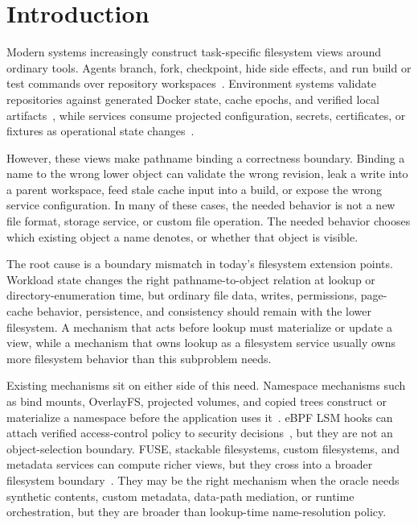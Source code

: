 \section{Introduction}

Modern systems increasingly construct task-specific filesystem views around
ordinary tools. Agents branch, fork, checkpoint, hide side effects, and run
build or test commands over repository
workspaces~\cite{agentfs_repo,branchfs_repo,yolofs_repo}. Environment systems
validate repositories against generated Docker state, cache epochs, and verified
local artifacts~\cite{docker_overview,swe_factory_repo,menvagent_repo,swe_rebench_v2_repo},
while services consume projected configuration, secrets, certificates, or
fixtures as operational state changes~\cite{kubernetes_projected_volumes}.

However, these views make pathname binding a correctness boundary. Binding a
name to the wrong lower object can validate the wrong revision, leak a write
into a parent workspace, feed stale cache input into a build, or expose the
wrong service configuration. In many of these cases, the needed behavior is not
a new file format, storage service, or custom file operation. The needed
behavior chooses which existing object a name denotes, or whether that object is
visible.

The root cause is a boundary mismatch in today's filesystem extension points.
Workload state changes the right pathname-to-object relation at lookup or
directory-enumeration time, but ordinary file data, writes, permissions,
page-cache behavior, persistence, and consistency should remain with the lower
filesystem. A mechanism that acts before lookup must materialize or update a
view, while a mechanism that owns lookup as a filesystem service usually owns
more filesystem behavior than this subproblem needs.

Existing mechanisms sit on either side of this need. Namespace mechanisms such
as bind mounts, OverlayFS, projected volumes, and copied trees construct or
materialize a namespace before the application uses
it~\cite{linux_mount,linux_overlayfs,kubernetes_projected_volumes}.
eBPF LSM hooks can attach verified access-control policy to security
decisions~\cite{linux_bpf_lsm},
but they are not an object-selection boundary. FUSE, stackable filesystems,
custom filesystems, and metadata services can compute richer views, but they
cross into a broader filesystem boundary~\cite{linux_fuse,wrapfs,bento,deltafs_sc21,indexfs,tablefs}.
They may be the right mechanism when the oracle needs synthetic contents,
custom metadata, data-path mediation, or runtime orchestration, but they are
broader than lookup-time name-resolution policy.


